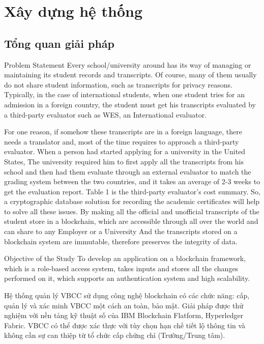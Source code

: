 \chapter{Xây dựng hệ thống}
\section{Tổng quan giải pháp}

Problem Statement
Every school/university around has its way of managing or maintaining its student records and transcripts. Of course, many of them usually do not share student information, such as transcripts for privacy reasons. Typically, in the case of international students, when one student tries for an admission in a foreign country, the student must get his transcripts evaluated by a third-party evaluator such as WES, an International evaluator.

For one reason, if somehow these transcripts are in a foreign language, there needs a
translator and, most of the time requires to approach a third-party evaluator. When a person had started applying for a university in the United States, The university required him to first apply all the transcripts from his school and then had them evaluate through an external evaluator to match the grading system between the two countries, and it takes an average of 2-3 weeks to get the evaluation report. Table 1 is the third-party evaluator's cost summary.
So, a cryptographic database solution for recording the academic certificates will help to solve all these issues. By making all the official and unofficial transcripts of the student store in a blockchain, which are accessible through all over the world and can share to any Employer or a University And the transcripts stored on a blockchain system are immutable, therefore preserves the integrity of data.

Objective of the Study
To develop an application on a blockchain framework, which is a role-based access system, takes inputs and stores all the changes performed on it, which supports an authentication system and high scalability.

Hệ thống quản lý VBCC sử dụng công nghệ blockchain có các chức năng: cấp, quản lý và xác minh VBCC một cách an toàn, bảo mật. Giải pháp được thử nghiệm với nền tảng kỹ thuật số của IBM Blockchain Flatform, Hyperledger Fabric. VBCC có thể được xác thực với tùy chọn hạn chế tiết lộ thông tin và không cần sự can thiệp từ tổ chức cấp chứng chỉ (Trường/Trung tâm).

